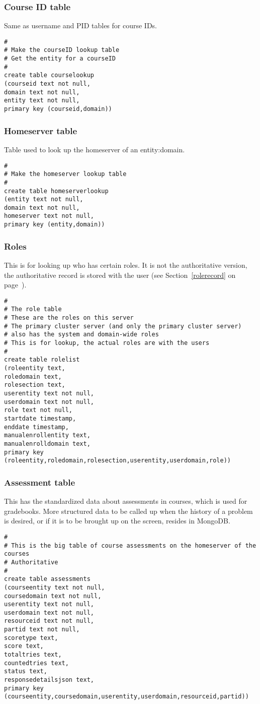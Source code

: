 \subsubsection{Course ID table}
Same as username and PID tables for course IDs.
\begin{verbatim}
#
# Make the courseID lookup table
# Get the entity for a courseID
#
create table courselookup
(courseid text not null,
domain text not null,
entity text not null,
primary key (courseid,domain))
\end{verbatim}
\subsubsection{Homeserver table}
Table used to look up the homeserver of an entity:domain.
\begin{verbatim}
#
# Make the homeserver lookup table
#
create table homeserverlookup
(entity text not null,
domain text not null,
homeserver text not null,
primary key (entity,domain))
\end{verbatim}
\subsubsection{Roles}\label{rolelookup}
This is for looking up who has certain roles. It is not the authoritative version, the authoritative record is stored with the user (see Section~\ref{rolerecord} on page~\pageref{rolerecord}).
\begin{verbatim}
#
# The role table
# These are the roles on this server
# The primary cluster server (and only the primary cluster server)
# also has the system and domain-wide roles
# This is for lookup, the actual roles are with the users
#
create table rolelist
(roleentity text,
roledomain text,
rolesection text,
userentity text not null,
userdomain text not null,
role text not null,
startdate timestamp,
enddate timestamp,
manualenrollentity text,
manualenrolldomain text,
primary key (roleentity,roledomain,rolesection,userentity,userdomain,role))
\end{verbatim}
\subsubsection{Assessment table}
This has the standardized data about assessments in courses, which is used for gradebooks. More structured data to be called up when the history of a problem is desired, or if it is to be brought up on the screen, resides in MongoDB.
\begin{verbatim}
#
# This is the big table of course assessments on the homeserver of the courses
# Authoritative
#
create table assessments
(courseentity text not null,
coursedomain text not null,
userentity text not null,
userdomain text not null,
resourceid text not null,
partid text not null,
scoretype text,
score text,
totaltries text,
countedtries text,
status text,
responsedetailsjson text,
primary key (courseentity,coursedomain,userentity,userdomain,resourceid,partid))
\end{verbatim}

